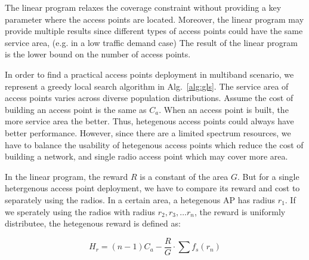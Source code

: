 

The linear program relaxes the coverage constraint without providing a key parameter
where the access points are located. Moreover, the linear program may provide 
multiple results since different types of access points could have the same service area, 
(e.g. in a low traffic demand case) The result of the linear program is the lower bound
on the number of access points. 

In order to find a practical access points deployment in multiband scenario, we represent 
a greedy local search algorithm in Alg.~\ref{alg:gls}. The service area of access points varies 
across diverse population distributions. Assume the cost of building an access point is the same as $C_a$. 
When an access point is built, the more service area the better. Thus, hetegenous access points
could always have better performance. However, since there are a limited spectrum resources,
we have to balance the usability of hetegenous access points which reduce the cost of building 
a network, and single radio access point which may cover more area.

In the linear program, the reward $R$ is a constant of the area $G$. But for a single hetergenous access
point deployment, we have to compare its reward and cost to separately using the radios.
In a certain area, a hetegenous AP has radius $r_1$. If we sperately using the radios with
radius $r_2,r_3,\dots r_n$, the reward is uniformly distributee, the hetegenous reward is defined as:

\begin{equation}
\label{eq:unitprice}
H_r=(n-1) C_a - \frac{R}{G}\cdot\sum f_s(r_n)
\end{equation}

